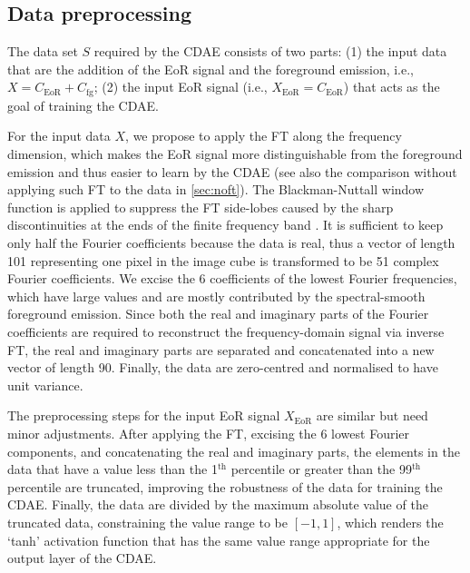 \documentclass[letters,fleqn,usenatbib,onecolumn]{mnras}
\newcommand{\R}[1]{\mathrm{#1}}
\begin{document}
\subsection{Data preprocessing}
\label{sec:preprocessing}

The data set $S$ required by the CDAE consists of two parts:
(1) the input data that are the addition of the EoR signal and the
foreground emission, i.e., $X = C_{\R{EoR}} + C_{\R{fg}}$;
(2) the input EoR signal (i.e., $X_{\R{EoR}} = C_{\R{EoR}}$)
that acts as the goal of training the CDAE.

For the input data $X$, we propose to apply the FT along the frequency
dimension, which makes the EoR signal more distinguishable from the
foreground emission and thus easier to learn by the CDAE (see also the
comparison without applying such FT to the data in \autoref{sec:noft}).
The Blackman-Nuttall window function is applied to suppress the
FT side-lobes caused by the sharp discontinuities at the ends
of the finite frequency band \citep[e.g.,][]{chapman2016}.
It is sufficient to keep only half the Fourier coefficients because
the data is real, thus a vector of length 101 representing one pixel in
the image cube is transformed to be 51 complex Fourier coefficients.
We excise the 6 coefficients of the lowest Fourier frequencies, which
have large values and are mostly contributed by the spectral-smooth
foreground emission.
Since both the real and imaginary parts of the Fourier coefficients
are required to reconstruct the frequency-domain signal via inverse FT,
the real and imaginary parts are separated and concatenated into a new
vector of length 90.
Finally, the data are zero-centred and normalised to have unit variance.

The preprocessing steps for the input EoR signal $X_{\R{EoR}}$ are
similar but need minor adjustments.
After applying the FT, excising the 6 lowest Fourier components, and
concatenating the real and imaginary parts,
the elements in the data that have a value less than the 1$^{\R{th}}$
percentile or greater than the 99$^{\R{th}}$ percentile are truncated,
improving the robustness of the data for training the CDAE.
Finally, the data are divided by the maximum absolute value of the
truncated data, constraining the value range to be $[-1, 1]$,
which renders the `tanh' activation function that has the same value
range appropriate for the output layer of the CDAE.


\end{document}
